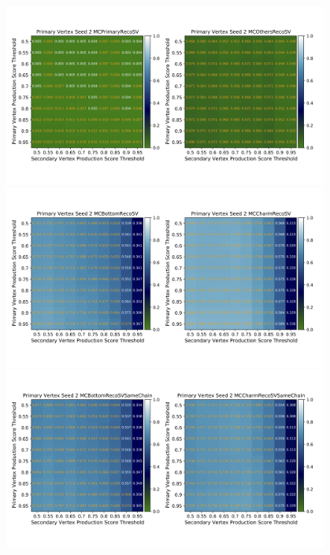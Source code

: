 \begin{figure}[htbp]
 \centering
  \begin{minipage}{1.0\textwidth}
   \centering
    \includegraphics[trim = 0 140 0 140, width=0.95\textwidth, clip]{Figure/4VertexFinderwithDL/4-2-2-3TrackEfficiencyPVOthers.png}
   \end{minipage}
   
   \begin{minipage}{1.0\textwidth}
   \centering
    \includegraphics[trim = 0 140 0 140, width=0.95\textwidth, clip]{Figure/4VertexFinderwithDL/4-2-2-3TrackEfficiencyBottomCharm.png}
   \end{minipage}
   
   \begin{minipage}{1.0\textwidth}
   \centering
    \includegraphics[trim = 0 140 0 140, width=0.95\textwidth, clip]{Figure/4VertexFinderwithDL/4-2-2-3TrackEfficiencySameChain.png}
   \end{minipage}
   

\end{figure}
